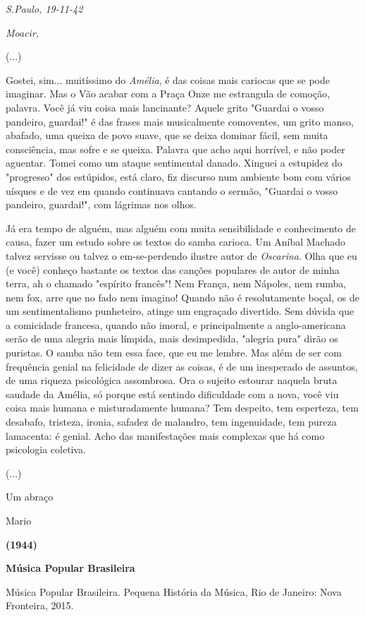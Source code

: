 \emph{S.Paulo, 19-11-42}

\emph{Moacir, }

(...)

Gostei, sim... muitíssimo do \emph{Amélia}, é das coisas mais cariocas
que se pode imaginar. Mas o Vão acabar com a Praça Onze me estrangula de
comoção, palavra. Você já viu coisa mais lancinante? Aquele grito
"Guardai o vosso pandeiro, guardai!" é das frases mais musicalmente
comoventes, um grito manso, abafado, uma queixa de povo suave, que se
deixa dominar fácil, sem muita consciência, mas sofre e se queixa.
Palavra que acho aqui horrível, e não poder aguentar. Tomei como um
ataque sentimental danado. Xinguei a estupidez do "progresso" dos
estúpidos, está claro, fiz discurso num ambiente bom com vários uísques
e de vez em quando continuava cantando o sermão, "Guardai o vosso
pandeiro, guardai!", com lágrimas nos olhos.

Já era tempo de alguém, mas alguém com muita sensibilidade e
conhecimento de causa, fazer um estudo sobre os textos do samba carioca.
Um Aníbal Machado talvez servisse ou talvez o em-se-perdendo ilustre
autor de \emph{Oscarina}. Olha que eu (e você) conheço bastante os
textos das canções populares de autor de minha terra, ah o chamado
"espírito francês"! Nem França, nem Nápoles, nem rumba, nem fox, arre
que no fado nem imagino! Quando não é resolutamente boçal, os de um
sentimentalismo punheteiro, atinge um engraçado divertido. Sem dúvida
que a comicidade francesa, quando não imoral, e principalmente a
anglo-americana serão de uma alegria mais límpida, mais desimpedida,
"alegria pura" dirão os puristas. O samba não tem essa face, que eu me
lembre. Mas além de ser com frequência genial na felicidade de dizer as
coisas, é de um inesperado de assuntos, de uma riqueza psicológica
assombrosa. Ora o sujeito estourar naquela bruta saudade da Amélia, só
porque está sentindo dificuldade com a nova, você viu coisa mais humana
e misturadamente humana? Tem despeito, tem esperteza, tem desabafo,
tristeza, ironia, safadez de malandro, tem ingenuidade, tem pureza
lamacenta: é genial. Acho das manifestações mais complexas que há como
psicologia coletiva.

(...)

Um abraço

Mario

\textbf{(1944)}

\textbf{Música Popular Brasileira}

Música Popular Brasileira. Pequena História da Música, Rio de Janeiro:
Nova Fronteira, 2015.

